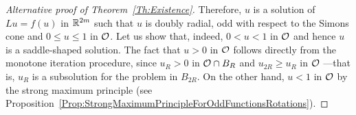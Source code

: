 \begin{proof}[Alternative proof of Theorem~\ref{Th:Existence}]
Therefore, $u$ is a solution of $Lu = f(u)$ in $\mathbb{R}^{2m}$ such that $u$ is doubly radial, odd with respect to the Simons cone and $0\leq u \leq 1$ in $\mathcal{O}$. Let us show that, indeed, $0 < u < 1$ in $\mathcal{O}$ and hence $u$ is a saddle-shaped solution. The fact that $u>0$ in $\mathcal{O}$ follows directly from the monotone iteration procedure, since $u_{R} > 0$ in $\mathcal{O} \cap B_R$ and $u_{2R} \geq u_{R}$ in $\mathcal{O}$ ---that is, $u_{R}$ is a subsolution for the problem in $B_{2R}$. On the other hand, $u < 1$ in $\mathcal{O}$ by the strong maximum principle (see Proposition~\ref{Prop:StrongMaximumPrincipleForOddFunctionsRotations}).
\end{proof}


